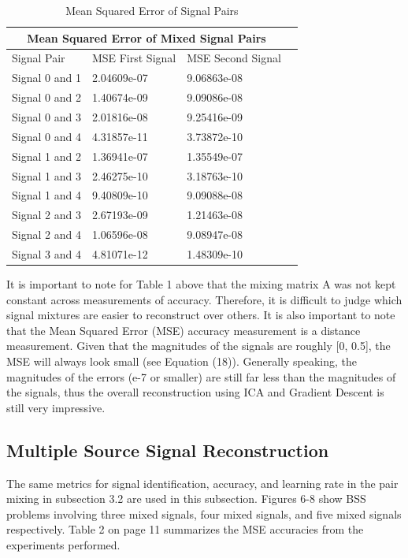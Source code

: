 \documentclass[12pt]{article}
\begin{document}
\FloatBarrier
\begin{table}[h!]
\centering
\begin{tabular}{ |p{3cm}||p{3cm}|p{3cm}|p{3cm}|  }
 \hline
 \multicolumn{3}{|c|}{Mean Squared Error of Mixed Signal Pairs} \\
 \hline
 Signal Pair& MSE First Signal & MSE Second Signal\\
 \hline
 Signal 0 and 1& 2.04609e-07& 9.06863e-08\\
 Signal 0 and 2& 1.40674e-09& 9.09086e-08\\
 Signal 0 and 3& 2.01816e-08& 9.25416e-09\\
 Signal 0 and 4& 4.31857e-11& 3.73872e-10\\
 Signal 1 and 2& 1.36941e-07& 1.35549e-07\\
 Signal 1 and 3& 2.46275e-10& 3.18763e-10\\
 Signal 1 and 4& 9.40809e-10& 9.09088e-08\\
 Signal 2 and 3& 2.67193e-09& 1.21463e-08\\
 Signal 2 and 4& 1.06596e-08& 9.08947e-08\\
 Signal 3 and 4& 4.81071e-12& 1.48309e-10\\
 \hline
\end{tabular}
\caption{Mean Squared Error of Signal Pairs}
\end{table}
\FloatBarrier
\noindent
It is important to note for Table 1 above that the mixing matrix A was not kept constant across measurements of accuracy. Therefore, it is difficult to judge which signal mixtures are easier to reconstruct over others. It is also important to note that the Mean Squared Error (MSE) accuracy measurement is a distance measurement. Given that the magnitudes of the signals are roughly [0, 0.5], the MSE will always look small (see Equation (18)). Generally speaking, the magnitudes of the errors (e-7 or smaller) are still far less than the magnitudes of the signals, thus the overall reconstruction using ICA and Gradient Descent is still very impressive.

\subsection{Multiple Source Signal Reconstruction}
The same metrics for signal identification, accuracy, and learning rate in the pair mixing in subsection 3.2 are used in this subsection. Figures 6-8 show BSS problems involving three mixed signals, four mixed signals, and five mixed signals respectively. Table 2 on page 11 summarizes the MSE accuracies from the experiments performed.
\end{document}
